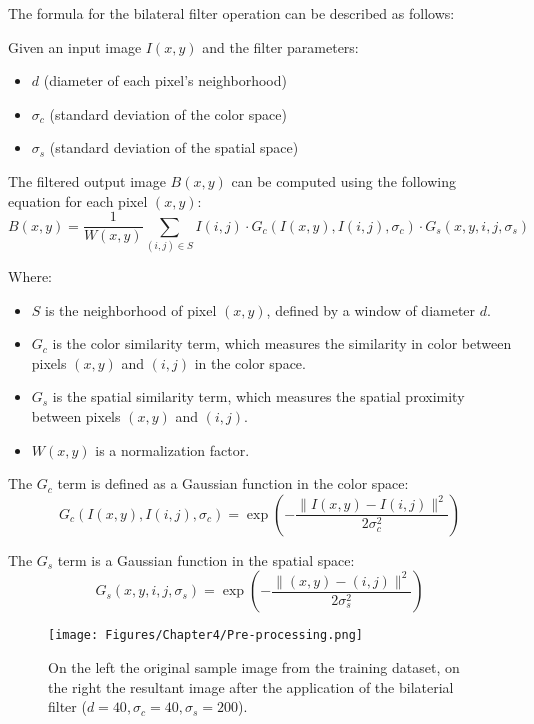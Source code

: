 The formula for the bilateral filter operation can be described as follows:

Given an input image \(I(x, y)\) and the filter parameters:
\begin{itemize}
    \item \(d\) (diameter of each pixel's neighborhood)
    \item \(\sigma_c\) (standard deviation of the color space)
    \item \(\sigma_s\) (standard deviation of the spatial space)
\end{itemize}
The filtered output image \(B(x, y)\) can be computed using the following equation for each pixel \((x, y)\):
\begin{equation}
   B(x, y) = \frac{1}{W(x, y)} \sum_{(i, j) \in S} I(i, j) \cdot G_c(I(x, y), I(i, j), \sigma_c) \cdot G_s(x, y, i, j, \sigma_s) 
\end{equation}


Where:
\begin{itemize}
    \item \(S\) is the neighborhood of pixel \((x, y)\), defined by a window of diameter \(d\).
    \item \(G_c\) is the color similarity term, which measures the similarity in color between pixels \((x, y)\) and \((i, j)\) in the color space.
    \item \(G_s\) is the spatial similarity term, which measures the spatial proximity between pixels \((x, y)\) and \((i, j)\).
    \item \(W(x, y)\) is a normalization factor.
\end{itemize}
The \(G_c\) term is defined as a Gaussian function in the color space:
\begin{equation}
    G_c(I(x, y), I(i, j), \sigma_c) = \exp\left(-\frac{\|I(x, y) - I(i, j)\|^2}{2\sigma_c^2}\right)
\end{equation}

The \(G_s\) term is a Gaussian function in the spatial space:
\begin{equation}
    G_s(x, y, i, j, \sigma_s) = \exp\left(-\frac{\|(x, y) - (i, j)\|^2}{2\sigma_s^2}\right)
\end{equation}

\begin{figure}[th]
    \centering
    \texttt{[image: Figures/Chapter4/Pre-processing.png]}
    \caption[Input and pre-processed image.]{On the left the original sample image from the training dataset, on the right the resultant image after the application of the bilaterial filter ($d = 40,\sigma_c = 40,\sigma_s = 200$).}
    \label{fig:Pre-processing}
\end{figure}

